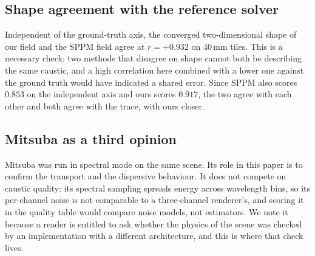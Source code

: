 \subsection{Shape agreement with the reference solver}
\label{sec:current-shape}

Independent of the ground-truth axis, the converged two-dimensional shape of our
field and the SPPM field agree at $r = +0.932$ on 40\,mm tiles. This is a necessary check: two methods that disagree on
shape cannot both be describing the same caustic, and a high correlation here
combined with a lower one against the ground truth would have indicated a shared
error. Since SPPM also scores $0.853$ on the independent axis and ours scores
$0.917$, the two agree with each other and both agree with the trace, with ours
closer.

\subsection{Mitsuba as a third opinion}
\label{sec:current-mitsuba}

Mitsuba was run in spectral mode on the same scene. Its role in this paper is to confirm the transport and the dispersive behaviour. It does not compete on caustic quality: its spectral sampling spreads energy across wavelength bins,
so its per-channel noise is not comparable to a three-channel renderer's, and
scoring it in the quality table would compare noise models, not
estimators. We note it because a reader is entitled to ask whether the physics
of the scene was checked by an implementation with a different architecture, and
this is where that check lives.
